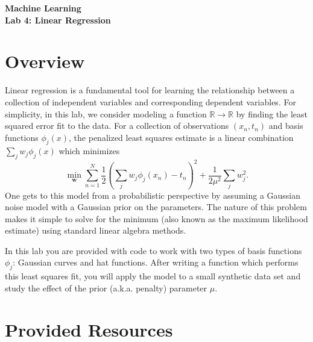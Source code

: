 \documentclass[11pt,noanswers,addpoints]{exam}
\begin{document}
{\Large{\textbf{Machine Learning}}} \\[2mm]
\textbf{\Huge{Lab 4: Linear Regression}}\\[2mm]




\section{Overview}

Linear regression is a fundamental tool for learning the relationship between a collection of independent variables
and corresponding dependent variables. For simplicity, in this lab, we consider
modeling a function $\mathbb{R} \rightarrow \mathbb{R}$ by finding the least squared error fit to the data.
For a collection of observations $(x_n,t_n)$ and basis functions $\phi_j(x)$, the penalized
least squares estimate is a linear combination $\sum_j w_j \phi_j(x)$ which minimizes
$$\min_{\mathbf w} \sum_{n=1}^N \frac{1}{2}\left(\sum_j w_j \phi_j(x_n) - t_n\right)^2 + \frac{1}{2\mu^2}\sum_j w_j^2.$$
 One gets to this
model from a probabilistic perspective by assuming a Gaussian noise model with a Gaussian
prior on the parameters. The nature of this problem
makes it simple to solve for the minimum (also known as the maximum likelihood estimate) using 
standard linear algebra methods.

In this lab you are provided with code to work with two types of basis functions $\phi_j$: Gaussian curves
and hat functions. After writing a function which performs this least squares fit, you will apply the
model to a small synthetic data set and study the effect of the prior (a.k.a. penalty) parameter $\mu$. %

\section{Provided Resources}
\end{document}
